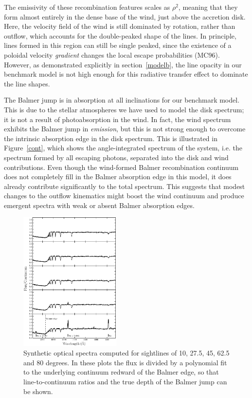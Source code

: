 \documentclass[preprint, a4paper, 11pt]{aastex}
\begin{document}
The emissivity of these recombination 
features scales as $\rho^2$, meaning that they form almost entirely in the 
dense base of the wind, just above the accretion disk. Here, the
velocity field of the wind is still dominated by rotation, rather than
outflow, which accounts for the double-peaked shape of the lines. In
principle, lines formed in this region can still be single peaked,
since the existence of a poloidal velocity {\em gradient} changes the
local escape probabilities (MC96). However, as
demonstrated explicitly in section~\ref{modelb}, the line opacity in our
benchmark model is not high enough for this radiative transfer effect
to dominate the line shapes.

The Balmer jump is in absorption at all inclinations for our benchmark
model. This is due to the stellar atmospheres we have used to
model the disk spectrum; it is not a result of photoabsorption in the
wind. In fact, the wind spectrum exhibits the Balmer jump in {\em
emission}, but this is not strong enough to overcome the intrinsic
absorption edge in the disk spectrum. This is illustrated in
Figure~\ref{cont}, which shows the angle-integrated spectrum of the system,
i.e. the spectrum formed by all escaping photons, separated into the
disk and wind contributions. Even though the wind-formed Balmer
recombination continuum does not completely fill in the Balmer
absorption edge in this model, it does already contribute
significantly to the total spectrum. This suggests that modest changes 
to the outflow kinematics might boost the wind continuum and produce
emergent spectra with weak or absent Balmer absorption edges. 

\begin{figure} 
\includegraphics[width=0.45\textwidth]{figures/modela_opt_cont.eps}
\caption{Synthetic optical spectra computed for 
sightlines of 10, 27.5, 45, 62.5 and 80 degrees. In these plots
the flux is divided by a polynomial fit to the 
underlying continuum redward of the Balmer edge, so that 
line-to-continuum ratios and the true depth of the
Balmer jump can be shown.}
\label{spec_continuum}
\end{figure} 
\end{document}
